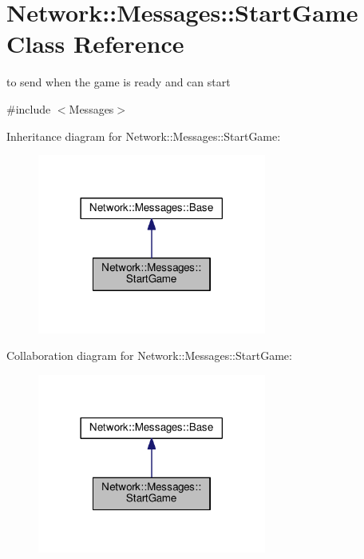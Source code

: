 \hypertarget{class_network_1_1_messages_1_1_start_game}{}\section{Network\+:\+:Messages\+:\+:Start\+Game Class Reference}
\label{class_network_1_1_messages_1_1_start_game}


to send when the game is ready and can start  




{\ttfamily \#include $<$Messages$>$}



Inheritance diagram for Network\+:\+:Messages\+:\+:Start\+Game\+:
\nopagebreak
\begin{figure}[H]
\begin{center}
\leavevmode
\includegraphics[width=213pt]{class_network_1_1_messages_1_1_start_game__inherit__graph}
\end{center}
\end{figure}


Collaboration diagram for Network\+:\+:Messages\+:\+:Start\+Game\+:
\nopagebreak
\begin{figure}[H]
\begin{center}
\leavevmode
\includegraphics[width=213pt]{class_network_1_1_messages_1_1_start_game__coll__graph}
\end{center}
\end{figure}
